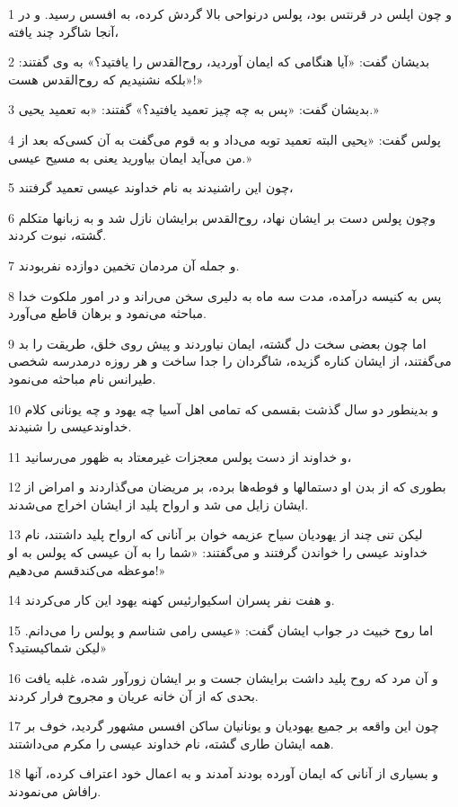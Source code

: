 \par 1 و چون اپلس در قرنتس بود، پولس درنواحی بالا گردش کرده، به افسس رسید. و در آنجا شاگرد چند یافته،
\par 2 بدیشان گفت: «آیا هنگامی که ایمان آوردید، روح‌القدس را یافتید؟» به وی گفتند: «بلکه نشنیدیم که روح‌القدس هست!»
\par 3 بدیشان گفت: «پس به چه چیز تعمید یافتید؟» گفتند: «به تعمید یحیی.»
\par 4 پولس گفت: «یحیی البته تعمید توبه می‌داد و به قوم می‌گفت به آن کسی‌که بعد از من می‌آید ایمان بیاورید یعنی به مسیح عیسی.»
\par 5 چون این راشنیدند به نام خداوند عیسی تعمید گرفتند،
\par 6 وچون پولس دست بر ایشان نهاد، روح‌القدس برایشان نازل شد و به زبانها متکلم گشته، نبوت کردند.
\par 7 و جمله آن مردمان تخمین دوازده نفربودند.
\par 8 پس به کنیسه درآمده، مدت سه ماه به دلیری سخن می‌راند و در امور ملکوت خدا مباحثه می‌نمود و برهان قاطع می‌آورد.
\par 9 اما چون بعضی سخت دل گشته، ایمان نیاوردند و پیش روی خلق، طریقت را بد می‌گفتند، از ایشان کناره گزیده، شاگردان را جدا ساخت و هر روزه درمدرسه شخصی طیرانس نام مباحثه می‌نمود.
\par 10 و بدینطور دو سال گذشت بقسمی که تمامی اهل آسیا چه یهود و چه یونانی کلام خداوندعیسی را شنیدند.
\par 11 و خداوند از دست پولس معجزات غیرمعتاد به ظهور می‌رسانید،
\par 12 بطوری که از بدن او دستمالها و فوطه‌ها برده، بر مریضان می‌گذاردند و امراض از ایشان زایل می شد و ارواح پلید از ایشان اخراج می‌شدند.
\par 13 لیکن تنی چند از یهودیان سیاح عزیمه خوان بر آنانی که ارواح پلید داشتند، نام خداوند عیسی را خواندن گرفتند و می‌گفتند: «شما را به آن عیسی که پولس به او موعظه می‌کندقسم می‌دهیم!»
\par 14 و هفت نفر پسران اسکیوارئیس کهنه یهود این کار می‌کردند.
\par 15 اما روح خبیث در جواب ایشان گفت: «عیسی رامی شناسم و پولس را می‌دانم. لیکن شماکیستید؟»
\par 16 و آن مرد که روح پلید داشت برایشان جست و بر ایشان زورآور شده، غلبه یافت بحدی که از آن خانه عریان و مجروح فرار کردند.
\par 17 چون این واقعه بر جمیع یهودیان و یونانیان ساکن افسس مشهور گردید، خوف بر همه ایشان طاری گشته، نام خداوند عیسی را مکرم می‌داشتند.
\par 18 و بسیاری از آنانی که ایمان آورده بودند آمدند و به اعمال خود اعتراف کرده، آنها رافاش می‌نمودند.
